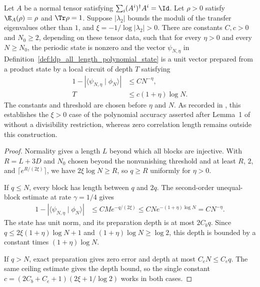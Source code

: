\begin{lemma}%
    \label{thm:ldp_all_length_polynomial_accuracy}
    \leanok
    Let $A$ be a normal tensor satisfying
    $\sum_i(A^i)^\dagger A^i=\Id$. Let $\rho>0$ satisfy
    $\E_A(\rho)=\rho$ and $\Tr\rho=1$.
    Suppose $|\lambda_2|$ bounds the moduli of the transfer eigenvalues
    other than $1$, and $\xi=-1/\log|\lambda_2|>0$.
    There are constants $C,c>0$ and $N_0\geq2$, depending on these
    tensor data, such that for every $\eta>0$ and every $N\geq N_0$,
    the periodic state is nonzero and the vector
    $\psi_{N,\eta}$ in Definition~\ref{def:ldp_all_length_polynomial_state}
    is a unit vector prepared from a product state by a local circuit
    of depth $T$ satisfying
    \begin{align}
        1-\left|\langle\psi_{N,\eta}\mid\phi_N\rangle\right|
          & \leq C N^{-\eta},\label{eq:ldp_all_length_polynomial_error} \\
        T & \leq c(1+\eta)\log N.
        \label{eq:ldp_all_length_polynomial_depth}
    \end{align}
    The constants and threshold are chosen before $\eta$ and $N$.
    As recorded in \cite{gap:mswc24_polynomial_accuracy_uniform_blocks}, this establishes the $\xi>0$ case of the polynomial accuracy asserted after
    Lemma~1 of \cite{Malz2024Preparation} without a divisibility
    restriction, whereas zero correlation length remains outside this construction.
\end{lemma}
\begin{proof}
    \leanok
    Normality gives a length $L$ beyond which all blocks are injective.
    With $R=L+3D$ and $N_0$ chosen beyond the nonvanishing threshold and
    at least $R$, $2$, and $\lceil e^{R/(2\xi)}\rceil$,
    we have $2\xi\log N\geq R$, so $q\geq R$ uniformly for $\eta>0$.

    If $q\leq N$, every block has length between $q$ and $2q$.
    The second-order unequal-block estimate at rate $\gamma=1/4$ gives
    \begin{align*}
        1-|\langle\psi_{N,\eta}\mid\phi_N\rangle|
         & \leq C M e^{-q/(2\xi)}
        \leq C N e^{-(1+\eta)\log N}=C N^{-\eta}.
    \end{align*}
    The state has unit norm, and its preparation depth is at most
    $2C_bq$. Since $q\leq2\xi(1+\eta)\log N+1$ and
    $(1+\eta)\log N\geq\log2$, this depth is bounded by a constant times
    $(1+\eta)\log N$.

    If $q>N$, exact preparation gives zero error and depth at most
    $C_eN\leq C_eq$. The same ceiling estimate gives the depth bound, so the single constant
    $c=(2C_b+C_e+1)(2\xi+1/\log2)$ works in both cases.
\end{proof}
